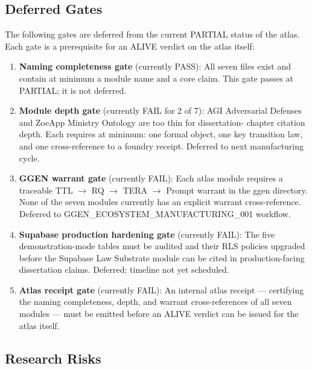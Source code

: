 \subsection{Deferred Gates}
\label{sec:atlas-open-deferred}

The following gates are deferred from the current PARTIAL status of the atlas.
Each gate is a prerequisite for an ALIVE verdict on the atlas itself:

\begin{enumerate}
  \item \textbf{Naming completeness gate} (currently PASS): All seven files
        exist and contain at minimum a module name and a core claim. This gate
        passes at PARTIAL; it is not deferred.

  \item \textbf{Module depth gate} (currently FAIL for 2 of 7): AGI Adversarial
        Defenses and ZoeApp Ministry Ontology are too thin for dissertation-
        chapter citation depth. Each requires at minimum: one formal object, one
        key transition law, and one cross-reference to a foundry receipt. Deferred
        to next manufacturing cycle.

  \item \textbf{GGEN warrant gate} (currently FAIL): Each atlas module requires
        a traceable TTL $\to$ RQ $\to$ TERA $\to$ Prompt warrant in the ggen
        directory. None of the seven modules currently has an explicit warrant
        cross-reference. Deferred to GGEN\_ECOSYSTEM\_MANUFACTURING\_001 workflow.

  \item \textbf{Supabase production hardening gate} (currently FAIL): The five
        demonstration-mode tables must be audited and their RLS policies upgraded
        before the Supabase Law Substrate module can be cited in
        production-facing dissertation claims. Deferred; timeline not yet
        scheduled.

  \item \textbf{Atlas receipt gate} (currently FAIL): An internal atlas receipt
        --- certifying the naming completeness, depth, and warrant cross-references
        of all seven modules --- must be emitted before an ALIVE verdict can be
        issued for the atlas itself.
\end{enumerate}

\subsection{Research Risks}
\label{sec:atlas-open-risks}


